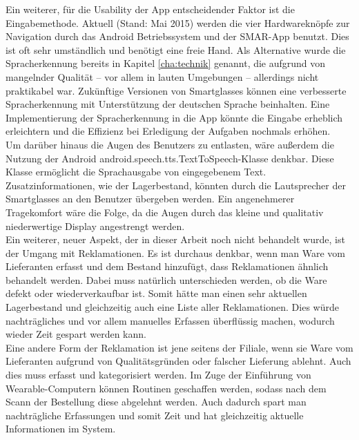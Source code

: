 Ein weiterer, für die Usability der App entscheidender Faktor ist die Eingabemethode. Aktuell (Stand: Mai 2015) werden die vier Hardwareknöpfe zur Navigation durch das Android Betriebssystem und der \ac{SMAR}-App benutzt. Dies ist oft sehr umständlich und benötigt eine freie Hand. Als Alternative wurde die Spracherkennung bereits in Kapitel \ref{cha:technik}  genannt, die aufgrund von mangelnder Qualität -- vor allem in lauten Umgebungen -- allerdings nicht praktikabel war. Zukünftige Versionen von Smartglasses können eine verbesserte Spracherkennung mit Unterstützung der deutschen Sprache beinhalten. Eine Implementierung der Spracherkennung in die App könnte die Eingabe erheblich erleichtern und die Effizienz bei Erledigung der Aufgaben nochmals erhöhen.\\
Um darüber hinaus die Augen des Benutzers zu entlasten, wäre außerdem die Nutzung der Android \glqq android.speech.tts.TextToSpeech\grqq -Klasse denkbar. Diese Klasse ermöglicht die Sprachausgabe von eingegebenem Text. Zusatzinformationen, wie \zB der Lagerbestand, könnten durch die Lautsprecher der Smartglasses an den Benutzer übergeben werden. Ein angenehmerer Tragekomfort wäre die Folge, da die Augen durch das kleine und qualitativ niederwertige Display angestrengt werden.\\

Ein weiterer, neuer Aspekt, der in dieser Arbeit noch nicht behandelt wurde, ist der Umgang mit Reklamationen. Es ist durchaus denkbar, wenn man Ware vom Lieferanten erfasst und dem Bestand hinzufügt, dass Reklamationen ähnlich behandelt werden. Dabei muss natürlich unterschieden werden, ob die Ware defekt oder wiederverkaufbar ist. Somit hätte man einen sehr aktuellen Lagerbestand und gleichzeitig auch eine Liste aller Reklamationen. Dies würde nachträgliches und vor allem manuelles Erfassen überflüssig machen, wodurch wieder Zeit gespart werden kann. \\

Eine andere Form der Reklamation ist jene seitens der Filiale, wenn sie Ware vom Lieferanten aufgrund von Qualitätsgründen oder falscher Lieferung ablehnt. Auch dies muss erfasst und kategorisiert werden. Im Zuge der Einführung von Wearable-Computern können Routinen geschaffen werden, sodass nach dem Scann der Bestellung diese abgelehnt werden. Auch dadurch spart man nachträgliche Erfassungen und somit Zeit und hat gleichzeitig aktuelle Informationen im System.\\


